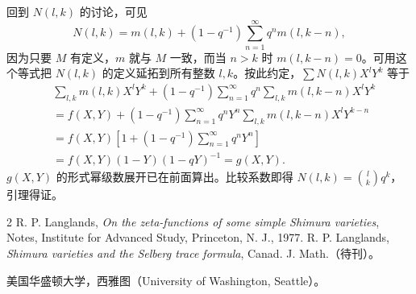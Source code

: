 回到 $N(l,k)$ 的讨论，可见
\[
N(l,k)=m(l,k)+(1-q^{-1})\sum_{n=1}^\infty q^nm(l,k-n),
\]
因为只要 $M$ 有定义，$m$ 就与 $M$ 一致，而当 $n>k$ 时 $m(l,k-n)=0$。可用这个等式把 $N(l,k)$ 的定义延拓到所有整数 $l,k$。按此约定，$\sum N(l,k)X^lY^k$ 等于
\begin{align*}
&\sum_{l,k}m(l,k)X^lY^k
 +(1-q^{-1})\sum_{n=1}^\infty q^n\sum_{l,k}m(l,k-n)X^lY^k\\
&=f(X,Y)+(1-q^{-1})\sum_{n=1}^\infty q^nY^n
 \sum_{l,k}m(l,k-n)X^lY^{k-n}\\
&=f(X,Y)\left[1+(1-q^{-1})\sum_{n=1}^\infty q^nY^n\right]\\
&=f(X,Y)(1-Y)(1-qY)^{-1}=g(X,Y).
\end{align*}
$g(X,Y)$ 的形式幂级数展开已在前面算出。比较系数即得 $N(l,k)=\binom lkq^k$，引理得证。

\begin{thebibliography}{2}
 R. P. Langlands, \textit{On the zeta-functions of some simple Shimura varieties}, Notes, Institute for Advanced Study, Princeton, N. J., 1977.
 R. P. Langlands, \textit{Shimura varieties and the Selberg trace formula}, Canad. J. Math.（待刊）。
\end{thebibliography}
\noindent 美国华盛顿大学，西雅图（University of Washington, Seattle）。
